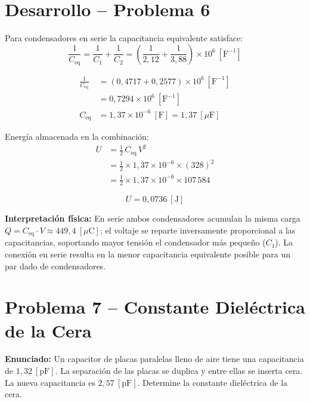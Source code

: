 \documentclass[12pt,letterpaper]{article}
\begin{document}
\section*{Desarrollo -- Problema 6}

Para condensadores en serie la capacitancia equivalente satisface:
\[
    \frac{1}{C_{\text{eq}}} = \frac{1}{C_1} + \frac{1}{C_2}
    = \left(\frac{1}{2{,}12} + \frac{1}{3{,}88}\right)\times10^{6}\ [\text{F}^{-1}]
\]

\begin{align*}
    \frac{1}{C_{\text{eq}}} &= (0{,}4717 + 0{,}2577)\times10^{6}\ [\text{F}^{-1}]\\[6pt]
                             &= 0{,}7294\times10^{6}\ [\text{F}^{-1}]\\[6pt]
    C_{\text{eq}}            &= 1{,}37\times10^{-6}\ [\text{F}] = 1{,}37\ [\mu\text{F}]
\end{align*}

Energ\'ia almacenada en la combinaci\'on:
\begin{align*}
    U &= \frac{1}{2}\,C_{\text{eq}}\,V^2\\[6pt]
      &= \frac{1}{2}\times 1{,}37\times10^{-6}\times(328)^2\\[6pt]
      &= \frac{1}{2}\times 1{,}37\times10^{-6}\times 107\,584
\end{align*}

\[
    \boxed{U = 0{,}0736\ [\text{J}]}
\]

\noindent\textbf{Interpretaci\'on f\'isica:} En serie ambos condensadores acumulan la misma carga $Q = C_{\text{eq}}\cdot V \approx 449{,}4\ [\mu\text{C}]$; el voltaje se reparte inversamente proporcional a las capacitancias, soportando mayor tensi\'on el condensador m\'as peque\~no ($C_1$). La conexi\'on en serie resulta en la menor capacitancia equivalente posible para un par dado de condensadores.

\newpage

\section*{Problema 7 -- Constante Diel\'ectrica de la Cera}

\noindent\textbf{Enunciado:} Un capacitor de placas paralelas lleno de aire tiene una capacitancia de $1{,}32\ [\text{pF}]$. La separaci\'on de las placas se duplica y entre ellas se inserta cera. La nueva capacitancia es $2{,}57\ [\text{pF}]$. Determine la constante diel\'ectrica de la cera.
\end{document}
